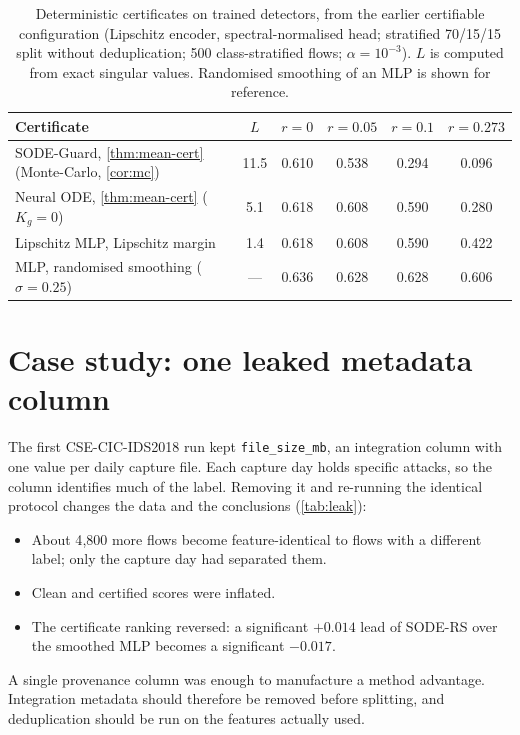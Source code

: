 \documentclass{article}
\theoremstyle{definition}
\begin{document}
\begin{table}[h]
\caption{Deterministic certificates on trained detectors, from the earlier
certifiable configuration (Lipschitz encoder, spectral-normalised head;
stratified 70/15/15 split without deduplication; 500 class-stratified flows;
$\alpha=10^{-3}$). $L$ is computed from exact singular values. Randomised
smoothing of an MLP is shown for reference.}
\label{tab:det-cert}
\centering\small
\begin{tabular}{lccccc}
\toprule
Certificate & $L$ & $r=0$ & $r=0.05$ & $r=0.1$ & $r=0.273$\\
\midrule
SODE-Guard, \cref{thm:mean-cert} (Monte-Carlo, \cref{cor:mc}) & 11.5 & 0.610 & 0.538 & 0.294 & 0.096\\
Neural ODE, \cref{thm:mean-cert} ($K_g=0$) & 5.1 & 0.618 & 0.608 & 0.590 & 0.280\\
Lipschitz MLP, Lipschitz margin & 1.4 & 0.618 & 0.608 & 0.590 & 0.422\\
MLP, randomised smoothing ($\sigma=0.25$) & --- & 0.636 & 0.628 & 0.628 & 0.606\\
\bottomrule
\end{tabular}
\end{table}

\section{Case study: one leaked metadata column}\label{app:leak}
The first CSE-CIC-IDS2018 run kept \texttt{file\_size\_mb}, an integration column
with one value per daily capture file. Each capture day holds specific attacks,
so the column identifies much of the label. Removing it and re-running the
identical protocol changes the data and the conclusions (\cref{tab:leak}):
\begin{itemize}
\item About 4{,}800 more flows become feature-identical to flows with a different
label; only the capture day had separated them.
\item Clean and certified scores were inflated.
\item The certificate ranking reversed: a significant $+0.014$ lead of SODE-RS
over the smoothed MLP becomes a significant $-0.017$.
\end{itemize}
A single provenance column was enough to manufacture a method advantage.
Integration metadata should therefore be removed before splitting, and
deduplication should be run on the features actually used.
\end{document}
